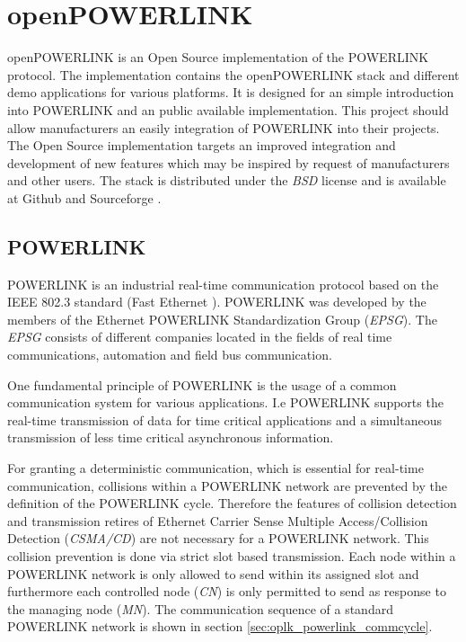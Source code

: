 \chapter{openPOWERLINK}
\label{cha:oplk}
openPOWERLINK is an Open Source implementation of the POWERLINK protocol.
The implementation contains the openPOWERLINK stack and different demo applications for various platforms.
It is designed for an simple introduction into POWERLINK and an public available implementation.
This project should allow manufacturers an easily integration of POWERLINK into their projects.
The Open Source implementation targets an improved integration and development of new features which may be inspired by request of manufacturers and other users.
The stack is distributed under the \emph{BSD} license and is available at Github \cite{openpowerlink_github} and Sourceforge \cite{openpowerlink_sourceforge}.


\section{POWERLINK}
\label{sec:oplk_powerlink}
POWERLINK is an industrial real-time communication protocol based on the IEEE 802.3 standard (Fast Ethernet \cite{ethernet_ieee_2016}).
POWERLINK was developed by the members of the Ethernet POWERLINK Standardization Group (\emph{EPSG}).
The \emph{EPSG} consists of different companies located in the fields of real time communications, automation and field bus communication. \cite{epsg_hp}

One fundamental principle of POWERLINK is the usage of a common communication system for various applications.
I.e POWERLINK supports the real-time transmission of data for time critical applications and a simultaneous transmission of less time critical asynchronous information.

For granting a deterministic communication, which is essential for real-time communication, collisions within a POWERLINK network are prevented by the definition of the POWERLINK cycle.
Therefore the features of collision detection and transmission retires of Ethernet Carrier Sense Multiple Access/Collision Detection (\emph{CSMA/CD}) are not necessary for a POWERLINK network. \cite[section 4.2]{ethernet_ieee_2016}
This collision prevention is done via strict slot based transmission.
Each node within a POWERLINK network is only allowed to send within its assigned slot and furthermore each controlled node (\emph{CN}) is only permitted to send as response to the managing node (\emph{MN}). \cite[chapter 1]{epsg_epsg_2013}
The communication sequence of a standard POWERLINK network is shown in section \ref{sec:oplk_powerlink_commcycle}.

